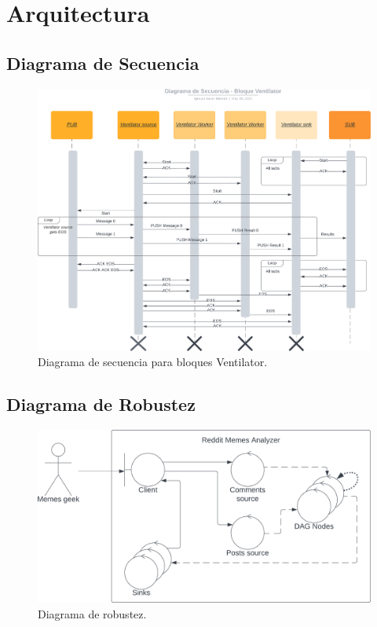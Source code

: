 \documentclass[titlepage,a4paper,oneside]{article}
\begin{document}
\section{Arquitectura}
\subsection{Diagrama de Secuencia}
\begin{figure}[H]
\centering
\includegraphics[width=\textwidth]{images/SequenceVentilator.png}
\caption{Diagrama de secuencia para bloques Ventilator.}
\end{figure}

\subsection{Diagrama de Robustez}
\begin{figure}[H]
\centering
\includegraphics[width=\textwidth]{images/Robustez.png}
\caption{Diagrama de robustez.}
\end{figure}
\end{document}
